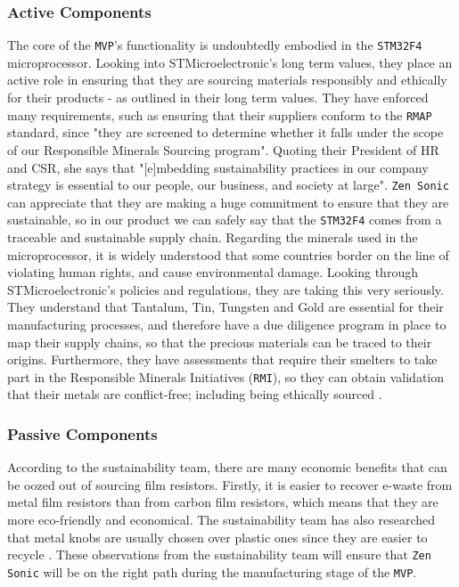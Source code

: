 \documentclass[12pt]{article}
\begin{document}
\subsubsection{Active Components}
The core of the \texttt{MVP}'s functionality is undoubtedly embodied in the \texttt{STM32F4} microprocessor. Looking into STMicroelectronic's long term values, they place an active role in ensuring that they are sourcing materials responsibly and ethically for their products - as outlined in their long term values\cite{STM1}. They have enforced many requirements, such as ensuring that their suppliers conform to the \texttt{RMAP} standard, since  "they are screened to determine whether it falls under the scope of our Responsible Minerals Sourcing program"\cite{STM2}. Quoting their President of HR and CSR, she says that "[e]mbedding sustainability practices in our company strategy is essential to our people, our business, and society at large"\cite{STM3}. \texttt{Zen Sonic} can appreciate that they are making a huge commitment to ensure that they are sustainable, so in our product we can safely say that the \texttt{STM32F4} comes from a traceable and sustainable supply chain. Regarding the minerals used in the microprocessor, it is widely understood that some countries border on the line of violating human rights, and cause environmental damage. Looking through STMicroelectronic's policies and regulations, they are taking this very seriously. They understand that Tantalum, Tin, Tungsten and Gold are essential for their manufacturing processes, and therefore have a due diligence program in place to map their supply chains, so that the precious materials can be traced to their origins. Furthermore, they have assessments that require their smelters to take part in the Responsible Minerals Initiatives (\texttt{RMI}), so they can obtain validation that their metals are conflict-free; including being ethically sourced \cite{STM4}.

\subsubsection{Passive Components}
 According to the sustainability team, there are many economic benefits that can be oozed out of sourcing film resistors. Firstly, it is easier to recover e-waste from metal film resistors than from carbon film resistors, which means that they are more eco-friendly and economical\cite{MFresistor}. The sustainability team has also researched that metal knobs are usually chosen over plastic ones since they are easier to recycle \cite{RecoEwaste}. These observations from the sustainability team will ensure that \texttt{Zen Sonic} will be on the right path during the manufacturing stage of the \texttt{MVP}. 
\end{document}
